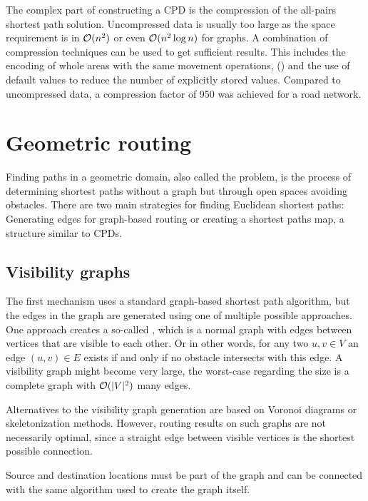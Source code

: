 			The complex part of constructing a CPD is the compression\cite{botea-cpd-2013} of the all-pairs shortest path solution.
			Uncompressed data is usually too large as the space requirement is in $\mathcal{O}(n^2)$ or even $\mathcal{O}(n^2 \log n)$ for graphs.
			A combination of compression techniques can be used to get sufficient results.
			This includes the encoding of whole areas with the same movement operations,  () and the use of default values to reduce the number of explicitly stored values\cite{botea-cpd-2013}.
			Compared to uncompressed data, a compression factor of 950 was achieved for a road network.
	
\section{Geometric routing}
\label{sec:geometric-routing}

	Finding paths in a geometric domain, also called the  problem, is the process of determining shortest paths without a graph but through open spaces avoiding obstacles.
	There are two main strategies for finding Euclidean shortest paths:
	Generating edges for graph-based routing or creating a shortest paths map, a structure similar to CPDs.
	
	\subsection{Visibility graphs}
	\label{subsec:visibility-graph}
	
		The first mechanism uses a standard graph-based shortest path algorithm, but the edges in the graph are generated using one of multiple possible approaches.
		One approach creates a so-called , which is a normal graph with edges between vertices that are visible to each other.
		Or in other words, for any two $u, v \in V$ an edge $(u, v) \in E$ exists if and only if no obstacle intersects with this edge.
		A visibility graph might become very large, the worst-case regarding the size is a complete graph with $\mathcal{O}(|V|^2)$ many edges.
		
		Alternatives to the visibility graph generation are based on Voronoi diagrams or skeletonization methods.
		However, routing results on such graphs are not necessarily optimal\cite{graser-osm-open-spaces}, since a straight edge between visible vertices is the shortest possible connection.
		
		Source and destination locations must be part of the graph and can be connected with the same algorithm used to create the graph itself.
	
